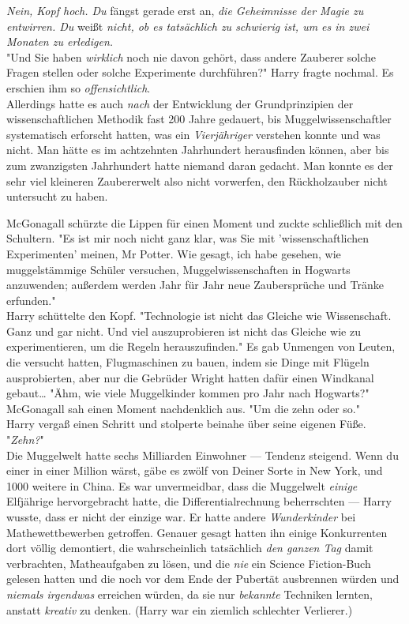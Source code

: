 {\emph{Nein, Kopf hoch. Du} fängst gerade erst an, \emph{die Geheimnisse der Magie zu entwirren. Du} weißt \emph{nicht, ob es tatsächlich zu schwierig ist, um es in zwei Monaten zu erledigen.}\\ "Und Sie haben \emph{wirklich} noch nie davon gehört, dass andere Zauberer solche Fragen stellen oder solche Experimente durchführen?" Harry fragte nochmal. Es erschien ihm so \emph{offensichtlich}.\\ Allerdings hatte es auch \emph{nach} der Entwicklung der Grundprinzipien der wissenschaftlichen Methodik fast 200 Jahre gedauert, bis Muggelwissenschaftler systematisch erforscht hatten, was ein \emph{Vierjähriger} verstehen konnte und was nicht. Man hätte es im achtzehnten Jahrhundert herausfinden können, aber bis zum zwanzigsten Jahrhundert hatte niemand daran gedacht. Man konnte es der sehr viel kleineren Zaubererwelt also nicht vorwerfen, den Rückholzauber nicht untersucht zu haben.

McGonagall schürzte die Lippen für einen Moment und zuckte schließlich mit den Schultern. "Es ist mir noch nicht ganz klar, was Sie mit 'wissenschaftlichen Experimenten' meinen, Mr Potter. Wie gesagt, ich habe gesehen, wie muggelstämmige Schüler versuchen, Muggelwissenschaften in Hogwarts anzuwenden; außerdem werden Jahr für Jahr neue Zaubersprüche und Tränke erfunden."\\ Harry schüttelte den Kopf. "Technologie ist nicht das Gleiche wie Wissenschaft. Ganz und gar nicht. Und viel auszuprobieren ist nicht das Gleiche wie zu experimentieren, um die Regeln herauszufinden." Es gab Unmengen von Leuten, die versucht hatten, Flugmaschinen zu bauen, indem sie Dinge mit Flügeln ausprobierten, aber nur die Gebrüder Wright hatten dafür einen Windkanal gebaut… "Ähm, wie viele Muggelkinder kommen pro Jahr nach Hogwarts?"\\ McGonagall sah einen Moment nachdenklich aus. "Um die zehn oder so."\\ Harry vergaß einen Schritt und stolperte beinahe über seine eigenen Füße. "\emph{Zehn?}"\\ Die Muggelwelt hatte sechs Milliarden Einwohner --- Tendenz steigend. Wenn du einer in einer Million wärst, gäbe es zwölf von Deiner Sorte in New York, und 1000 weitere in China. Es war unvermeidbar, dass die Muggelwelt \emph{einige} Elfjährige hervorgebracht hatte, die Differentialrechnung beherrschten --- Harry wusste, dass er nicht der einzige war. Er hatte andere \emph{Wunderkinder} bei Mathewettbewerben getroffen. Genauer gesagt hatten ihn einige Konkurrenten dort völlig demontiert, die wahrscheinlich tatsächlich \emph{den ganzen Tag} damit verbrachten, Matheaufgaben zu lösen, und die \emph{nie} ein Science Fiction-Buch gelesen hatten und die noch vor dem Ende der Pubertät ausbrennen würden und \emph{niemals irgendwas} erreichen würden, da sie nur \emph{bekannte} Techniken lernten, anstatt \emph{kreativ} zu denken. (Harry war ein ziemlich schlechter Verlierer.)

}
